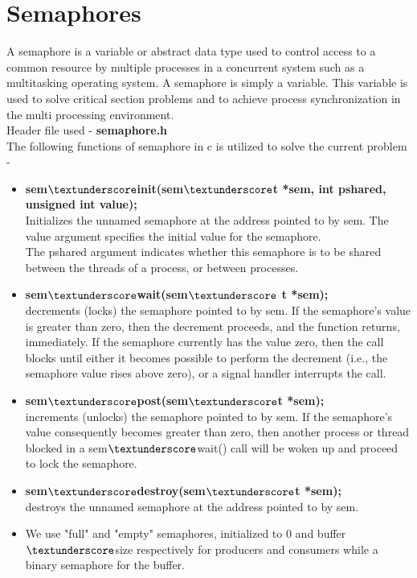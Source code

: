 \documentclass[12pt]{article}
\begin{document}
\section{Semaphores}
A semaphore is a variable or abstract data type used to control access to a common resource by multiple processes in a concurrent system such as a multitasking operating system. A semaphore is simply a variable. This variable is used to solve critical section problems and to achieve process synchronization in the multi processing environment.\\
Header file used - \textbf{semaphore.h}\\
The following functions of semaphore in c is  utilized to solve the current problem - 
\begin{itemize}
\item \textbf{sem$\textunderscore$init(sem$\textunderscore$t *sem, int pshared, unsigned int value);}\\
Initializes the unnamed semaphore at the address pointed
to by sem.  The value argument specifies the initial value for the
semaphore.\\
The pshared argument indicates whether this semaphore is to be shared
between the threads of a process, or between processes.
\item \textbf{sem$\textunderscore$wait(sem$\textunderscore$ t *sem);}\\
decrements (locks) the semaphore pointed to by sem.  If
the semaphore's value is greater than zero, then the decrement
proceeds, and the function returns, immediately.  If the semaphore
currently has the value zero, then the call blocks until either it
becomes possible to perform the decrement (i.e., the semaphore value
rises above zero), or a signal handler interrupts the call.
\item \textbf{sem$\textunderscore$post(sem$\textunderscore$t *sem);}\\
increments (unlocks) the semaphore pointed to by sem.  If
the semaphore's value consequently becomes greater than zero, then
another process or thread blocked in a sem$\textunderscore$wait() call will be woken
up and proceed to lock the semaphore.
\item \textbf{sem$\textunderscore$destroy(sem$\textunderscore$t *sem);}\\
destroys the unnamed semaphore at the address pointed to by sem.
\item We use "full" and "empty" semaphores, initialized to 0 and buffer$\textunderscore$size respectively for producers and consumers while a binary semaphore for the buffer.
\end{itemize}
\end{document}
